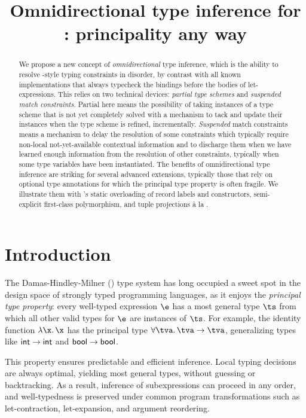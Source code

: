 \documentclass[acmsmall,screen,nonacm]{acmart}
\title{Omnidirectional type inference for \ML: principality any way}
\begin{document}
\begin{abstract}
We propose a new concept of \emph{omnidirectional} type inference, which is
the ability to resolve \ML-style typing constraints in disorder, by
contrast with all known implementations that always typecheck the
bindings before the bodies of let-expressions.
%
This relies on two technical devices: \emph{partial type schemes}
and \emph{suspended match constraints}. Partial here means  the
possibility of taking instances of a type scheme that is not yet
completely solved with a mechanism to tack and update their instances when
the type scheme is refined, incrementally.
\emph{Suspended} match constraints means a mechanism to delay the resolution of
some constraints which typically require non-local not-yet-available
contextual information and to  discharge them when we have learned enough
information from the resolution of other constraints, typically when some type
variables have been instantiated.
%
The benefits of omnidirectional type inference are striking for several
advanced \ML extensions, typically those that rely on optional type
annotations for which the principal type property is often fragile.  We
illustrate them with \OCaml's static overloading of record labels and
constructors, semi-explicit first-class polymorphism, and tuple projections
\`a la \SML.
\end{abstract}
\maketitle

\section{Introduction}
\label{sec/introduction}


The Damas-Hindley-Milner (\HM) \cite{Damas-Milner/W@popl82} type system has
long occupied a sweet spot in the design space of strongly typed programming
languages, as it enjoys the \emph{principal type property}: every well-typed
expression $\e$ has a most general type $\ts$ from which all other valid
types for $\e$ are instances of $\ts$. For example, the identity function
$\efun \x \x$ has the principal type $\tfor \tv \tv \to \tv$, generalizing
types like $\mathsf{int} \to \mathsf{int}$ and $\mathsf{bool} \to \mathsf{bool}$.


This property ensures predictable and efficient inference. Local typing
decisions are always optimal, yielding most general types, without guessing or
backtracking. As a result, inference of subexpressions can proceed in any
order, and well-typedness is preserved under common program transformations
such as let-contraction, let-expansion, and argument reordering.
\end{document}
